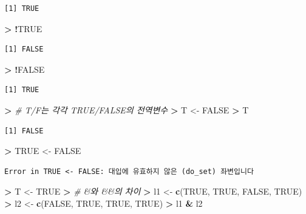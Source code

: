 \documentclass[12pt,a4paper]{book}
\newenvironment{Shaded}{\begin{snugshade}}{\end{snugshade}}
\newcommand{\KeywordTok}[1]{\textcolor[rgb]{0.13,0.29,0.53}{\textbf{#1}}}
\newcommand{\StringTok}[1]{\textcolor[rgb]{0.31,0.60,0.02}{#1}}
\newcommand{\CommentTok}[1]{\textcolor[rgb]{0.56,0.35,0.01}{\textit{#1}}}
\newcommand{\OtherTok}[1]{\textcolor[rgb]{0.56,0.35,0.01}{#1}}
\newcommand{\OperatorTok}[1]{\textcolor[rgb]{0.81,0.36,0.00}{\textbf{#1}}}
\newcommand{\ErrorTok}[1]{\textcolor[rgb]{0.64,0.00,0.00}{\textbf{#1}}}
\newcommand{\NormalTok}[1]{#1}
\theoremstyle{definition}
\theoremstyle{definition}
\theoremstyle{definition}
\theoremstyle{remark}
\begin{document}
\begin{verbatim}
[1] TRUE
\end{verbatim}

\begin{Shaded}
\begin{Highlighting}[]
\OperatorTok{>}\StringTok{ }\OperatorTok{!}\OtherTok{TRUE}
\end{Highlighting}
\end{Shaded}

\begin{verbatim}
[1] FALSE
\end{verbatim}

\begin{Shaded}
\begin{Highlighting}[]
\OperatorTok{>}\StringTok{ }\OperatorTok{!}\OtherTok{FALSE}
\end{Highlighting}
\end{Shaded}

\begin{verbatim}
[1] TRUE
\end{verbatim}

\begin{Shaded}
\begin{Highlighting}[]
\OperatorTok{>}\StringTok{ }\CommentTok{# T/F는 각각 TRUE/FALSE의 전역변수}
\ErrorTok{>}\StringTok{ }\NormalTok{T <-}\StringTok{ }\OtherTok{FALSE}
\OperatorTok{>}\StringTok{ }\NormalTok{T}
\end{Highlighting}
\end{Shaded}

\begin{verbatim}
[1] FALSE
\end{verbatim}

\begin{Shaded}
\begin{Highlighting}[]
\OperatorTok{>}\StringTok{ }\OtherTok{TRUE}\NormalTok{ <-}\StringTok{ }\OtherTok{FALSE}
\end{Highlighting}
\end{Shaded}

\begin{verbatim}
Error in TRUE <- FALSE: 대입에 유효하지 않은 (do_set) 좌변입니다
\end{verbatim}

\begin{Shaded}
\begin{Highlighting}[]
\OperatorTok{>}\StringTok{ }\NormalTok{T <-}\StringTok{ }\OtherTok{TRUE}
\OperatorTok{>}\StringTok{ }\CommentTok{# &와 &&의 차이}
\ErrorTok{>}\StringTok{ }\NormalTok{l1 <-}\StringTok{ }\KeywordTok{c}\NormalTok{(}\OtherTok{TRUE}\NormalTok{, }\OtherTok{TRUE}\NormalTok{, }\OtherTok{FALSE}\NormalTok{, }\OtherTok{TRUE}\NormalTok{)}
\OperatorTok{>}\StringTok{ }\NormalTok{l2 <-}\StringTok{ }\KeywordTok{c}\NormalTok{(}\OtherTok{FALSE}\NormalTok{, }\OtherTok{TRUE}\NormalTok{, }\OtherTok{TRUE}\NormalTok{, }\OtherTok{TRUE}\NormalTok{)}
\OperatorTok{>}\StringTok{ }\NormalTok{l1 }\OperatorTok{&}\StringTok{ }\NormalTok{l2}
\end{Highlighting}
\end{Shaded}
\end{document}
